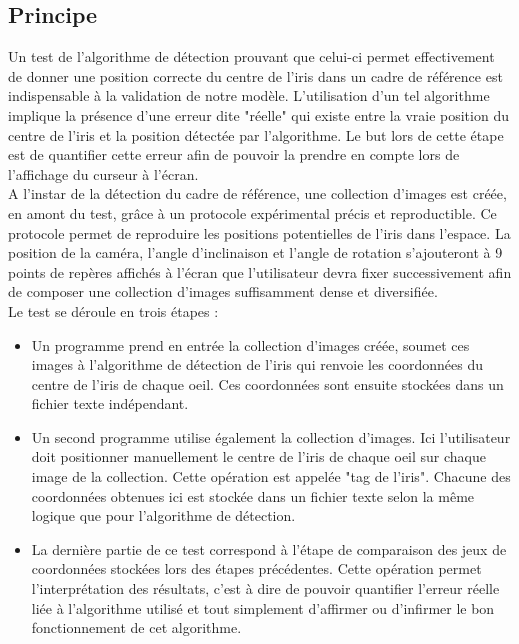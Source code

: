 \documentclass[a4paper, 12pt]{report}
\begin{document}
        	\subsection{Principe}
             Un test de l'algorithme de détection prouvant que celui-ci permet effectivement de donner une position correcte du centre de l'iris dans un cadre de référence est indispensable à la validation de notre modèle. L'utilisation d'un tel algorithme implique la présence d'une erreur dite "réelle" qui existe entre la vraie position du centre de l'iris et la position détectée par l'algorithme. Le but lors de cette étape est de quantifier cette erreur afin de pouvoir la prendre en compte lors de l'affichage du curseur à l'écran.\\
    A l'instar de la détection du cadre de référence, une collection d'images est créée, en amont du test, grâce à un protocole expérimental précis et reproductible. Ce protocole permet de reproduire les positions potentielles de l'iris dans l'espace. La position de la caméra, l'angle d'inclinaison et l'angle de rotation s'ajouteront à 9 points de repères affichés à l'écran que l'utilisateur devra fixer successivement afin de composer une collection d'images suffisamment dense et diversifiée. \\
    Le test se déroule en trois étapes :
    
\begin{itemize}
\item Un programme prend en entrée la collection d'images créée, soumet ces images à l'algorithme de détection de l'iris qui renvoie les coordonnées du centre de l'iris de chaque oeil. Ces coordonnées sont ensuite stockées dans un fichier texte indépendant.
\item Un second programme utilise également la collection d'images. Ici l'utilisateur doit positionner manuellement le centre de l'iris de chaque oeil sur chaque image de la collection. Cette opération est appelée "tag de l'iris". Chacune des coordonnées obtenues ici est stockée dans un fichier texte selon la même logique que pour l'algorithme de détection.
\item La dernière partie de ce test correspond à l'étape de comparaison des jeux de coordonnées stockées lors des étapes précédentes. Cette opération permet l'interprétation des résultats, c'est à dire de pouvoir quantifier l'erreur réelle liée à l'algorithme utilisé et tout simplement d'affirmer ou d'infirmer le bon fonctionnement de cet algorithme.
\end{itemize}
\end{document}
